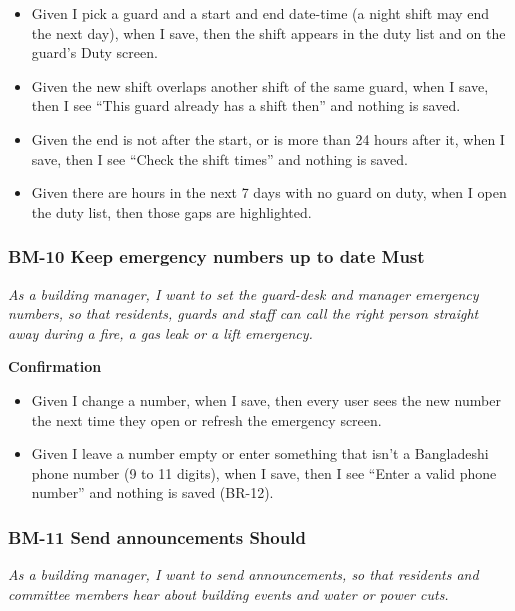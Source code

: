 \documentclass[11pt,a4paper]{report}
\begin{document}
\begin{itemize}
  \item Given I pick a guard and a start and end date-time (a night shift may end the next day), when I save, then the shift appears in the duty list and on the guard's Duty screen.
  \item Given the new shift overlaps another shift of the same guard, when I save, then I see ``This guard already has a shift then'' and nothing is saved.
  \item Given the end is not after the start, or is more than 24 hours after it, when I save, then I see ``Check the shift times'' and nothing is saved.
  \item Given there are hours in the next 7 days with no guard on duty, when I open the duty list, then those gaps are highlighted.
\end{itemize}

\subsubsection*{BM-10 \textperiodcentered{} Keep emergency numbers up to date \textperiodcentered{} Must}

\emph{As a building manager, I want to set the guard-desk and manager emergency numbers, so that residents, guards and staff can call the right person straight away during a fire, a gas leak or a lift emergency.}

\medskip\noindent\textbf{Confirmation}\par

\begin{itemize}
  \item Given I change a number, when I save, then every user sees the new number the next time they open or refresh the emergency screen.
  \item Given I leave a number empty or enter something that isn't a Bangladeshi phone number (9 to 11 digits), when I save, then I see ``Enter a valid phone number'' and nothing is saved (BR-12).
\end{itemize}

\subsubsection*{BM-11 \textperiodcentered{} Send announcements \textperiodcentered{} Should}

\emph{As a building manager, I want to send announcements, so that residents and committee members hear about building events and water or power cuts.}
\end{document}
